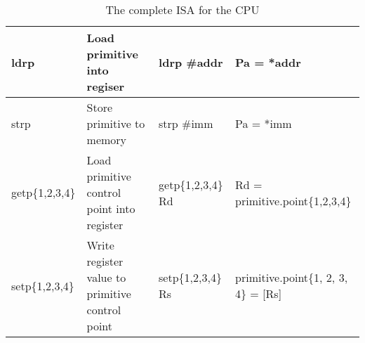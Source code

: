 \begin{table}[H]
\begin{tabular}{|p{2.1cm}|p{4cm}|p{4cm}|p{3cm}|}
    ldrp        & Load primitive into regiser          & ldrp \#addr            & Pa = *addr                                                 \\ \hline
    strp        & Store primitive to memory            & strp \#imm             & Pa = *imm                                                  \\ \hline
    getp\{1,2,3,4\} & Load primitive control point into register & getp\{1,2,3,4\} Rd  & Rd = primitive.point\{1,2,3,4\}                           \\ \hline
    setp\{1,2,3,4\} & Write register value to primitive control point & setp\{1,2,3,4\} Rs  & primitive.point\{1, 2, 3, 4\} = [Rs] \\ \hline
    \end{tabular}
    \caption{The complete ISA for the CPU}
\end{table}

